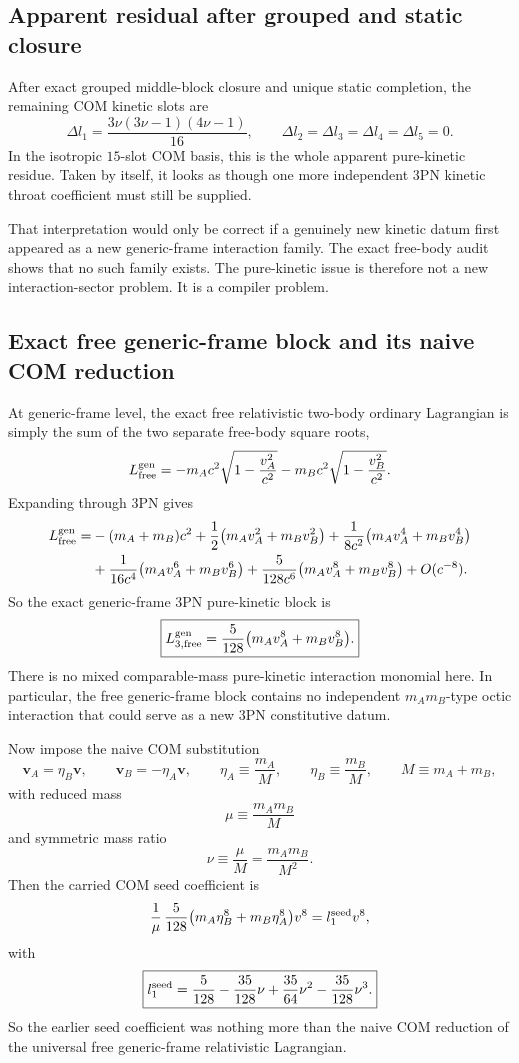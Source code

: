 \documentclass[11pt]{article}
\begin{document}
\subsection{Apparent residual after grouped and static closure}
\label{app:pure_kinetic_collapse_derivation:apparent_residual}

After exact grouped middle-block closure and unique static completion, the remaining COM kinetic slots are
\[
\boxed{
\Delta l_1=\frac{3\nu(3\nu-1)(4\nu-1)}{16},
\qquad
\Delta l_2=\Delta l_3=\Delta l_4=\Delta l_5=0.
}
\]
In the isotropic $15$-slot COM basis, this is the whole apparent pure-kinetic residue. Taken by itself, it looks as though one more independent $3$PN kinetic throat coefficient must still be supplied.

That interpretation would only be correct if a genuinely new kinetic datum first appeared as a new generic-frame interaction family. The exact free-body audit shows that no such family exists. The pure-kinetic issue is therefore not a new interaction-sector problem. It is a compiler problem.

\subsection{Exact free generic-frame block and its naive COM reduction}
\label{app:pure_kinetic_collapse_derivation:generic_frame_block}

At generic-frame level, the exact free relativistic two-body ordinary Lagrangian is simply the sum of the two separate free-body square roots,
\[
L_{\rm free}^{\rm gen}
=
-m_Ac^2\sqrt{1-\frac{v_A^2}{c^2}}
-
 m_Bc^2\sqrt{1-\frac{v_B^2}{c^2}}.
\]
Expanding through $3$PN gives
\[
\begin{aligned}
L_{\rm free}^{\rm gen}
=
&-(m_A+m_B)c^2
+\frac12\bigl(m_Av_A^2+m_Bv_B^2\bigr)
+\frac{1}{8c^2}\bigl(m_Av_A^4+m_Bv_B^4\bigr)
\\
&+\frac{1}{16c^4}\bigl(m_Av_A^6+m_Bv_B^6\bigr)
+\frac{5}{128c^6}\bigl(m_Av_A^8+m_Bv_B^8\bigr)
+O(c^{-8}).
\end{aligned}
\]
So the exact generic-frame $3$PN pure-kinetic block is
\[
\boxed{
L_{3,\rm free}^{\rm gen}
=
\frac{5}{128}\bigl(m_Av_A^8+m_Bv_B^8\bigr).
}
\]
There is no mixed comparable-mass pure-kinetic interaction monomial here. In particular, the free generic-frame block contains no independent $m_Am_B$-type octic interaction that could serve as a new $3$PN constitutive datum.

Now impose the naive COM substitution
\[
\mathbf v_A=\eta_B\mathbf v,
\qquad
\mathbf v_B=-\eta_A\mathbf v,
\qquad
\eta_A\equiv\frac{m_A}{M},
\qquad
\eta_B\equiv\frac{m_B}{M},
\qquad
M\equiv m_A+m_B,
\]
with reduced mass
\[
\mu\equiv\frac{m_Am_B}{M}
\]
and symmetric mass ratio
\[
\nu\equiv\frac{\mu}{M}=\frac{m_Am_B}{M^2}.
\]
Then the carried COM seed coefficient is
\[
\frac{1}{\mu}\,\frac{5}{128}\bigl(m_A\eta_B^8+m_B\eta_A^8\bigr)v^8
=
 l_1^{\rm seed}v^8,
\]
with
\[
\boxed{
 l_1^{\rm seed}
 =
 \frac{5}{128}-\frac{35}{128}\nu+\frac{35}{64}\nu^2-\frac{35}{128}\nu^3.
}
\]
So the earlier seed coefficient was nothing more than the naive COM reduction of the universal free generic-frame relativistic Lagrangian.
\end{document}
